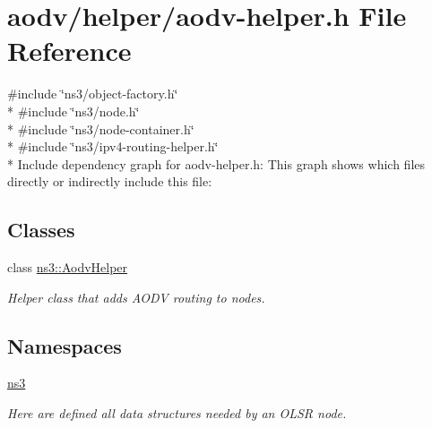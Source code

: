 \hypertarget{aodv-helper_8h}{}\section{aodv/helper/aodv-\/helper.h File Reference}
\label{aodv-helper_8h}
{\ttfamily \#include \char`\"{}ns3/object-\/factory.\+h\char`\"{}}\\*
{\ttfamily \#include \char`\"{}ns3/node.\+h\char`\"{}}\\*
{\ttfamily \#include \char`\"{}ns3/node-\/container.\+h\char`\"{}}\\*
{\ttfamily \#include \char`\"{}ns3/ipv4-\/routing-\/helper.\+h\char`\"{}}\\*
Include dependency graph for aodv-\/helper.h\+:
This graph shows which files directly or indirectly include this file\+:
\subsection*{Classes}
\begin{DoxyCompactItemize}
\item 
class \hyperlink{classns3_1_1AodvHelper}{ns3\+::\+Aodv\+Helper}
\begin{DoxyCompactList}\small\item\em Helper class that adds A\+O\+DV routing to nodes. \end{DoxyCompactList}\end{DoxyCompactItemize}
\subsection*{Namespaces}
\begin{DoxyCompactItemize}
\item 
 \hyperlink{namespacens3}{ns3}
\begin{DoxyCompactList}\small\item\em Here are defined all data structures needed by an O\+L\+SR node. \end{DoxyCompactList}\end{DoxyCompactItemize}
